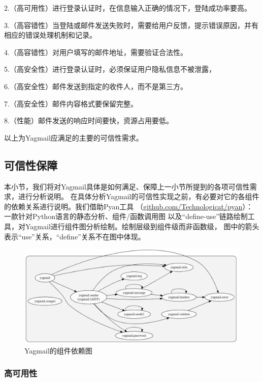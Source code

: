 \documentclass[UTF8,12pt,a4paper]{ctexart}
\begin{document}
    2.（高可用性）进行登录认证时，在信息输入正确的情况下，登陆成功率要高。
    
    3.（高容错性）当登陆或邮件发送失败时，需要给用户反馈，提示错误原因，并有相应的错误处理机制和记录。
    
    4.（高容错性）对用户填写的邮件地址，需要验证合法性。
    
    5.（高安全性）进行登录认证时，必须保证用户隐私信息不被泄露，
    
    6.（高安全性）邮件发送到指定的收件人，而不是第三方。
    
    7.（高安全性）邮件内容格式要保留完整。
    
    8.（性能）邮件发送的响应时间要快，资源占用要低。
    
    以上为Yagmail应满足的主要的可信性需求。

\subsection{可信性保障}

    本小节，我们将对Yagmail具体是如何满足、保障上一小节所提到的各项可信性需求，进行分析说明。
    在具体分析Yagmail的可信性实现之前，有必要对它的各组件的依赖关系进行说明。我们借助Pyan工具
    （\url{github.com/Technologicat/pyan}）：一款针对Python语言的静态分析、组件/函数调用图
    以及“define-use”链路绘制工具，对Yagmail进行组件图分析绘制。绘制层级到组件级而非函数级，
    图中的箭头表示“use”关系，“define”关系不在图中体现。
    
    \begin{figure}[H]
        \centering
        \includegraphics[width=0.99\textwidth]{figure/component-dep-graph.png}
        \caption{Yagmail的组件依赖图}
        \label{fig:component-dep-graph}
    \end{figure}
    
    \subsubsection{高可用性}
    
\end{document}
